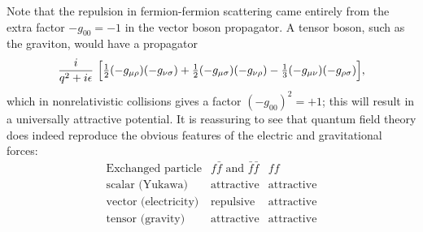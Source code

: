 Note that the repulsion in fermion-fermion scattering came entirely from the
extra factor $-g_{00} = -1$ in the vector boson propagator.  A tensor boson,
such as the graviton, would have a propagator
\begin{equation}
  \frac{i}{q^2+i\epsilon}\ \Bigl[
    \tfrac{1}{2}(-g_{\mu\rho})(-g_{\nu\sigma}) + \tfrac{1}{2}(-g_{\mu\sigma})
      (-g_{\nu\rho}) - \tfrac{1}{3}(-g_{\mu\nu})(-g_{\rho\sigma}) \Bigr] ,
  \label{eq:4.136}
\end{equation}
which in nonrelativistic collisions gives a factor $(-g_{00})^2 = +1$; this
will result in a universally attractive potential.  It is reassuring to see
that quantum field theory does indeed reproduce the obvious features of the
electric and gravitational forces:
\begin{equation}
  \begin{array}{ccc}
    \text{Exchanged particle} & f\bar{f}\text{ and }\bar{f}\bar{f} & ff\\
    \hline
    \text{scalar (Yukawa)} & \text{attractive} & \text{attractive}\\
    \text{vector (electricity)} & \text{repulsive} & \text{attractive}\\
    \text{tensor (gravity)} & \text{attractive} & \text{attractive}
  \end{array}
  \label{eq:4.137}
\end{equation}

\problems

